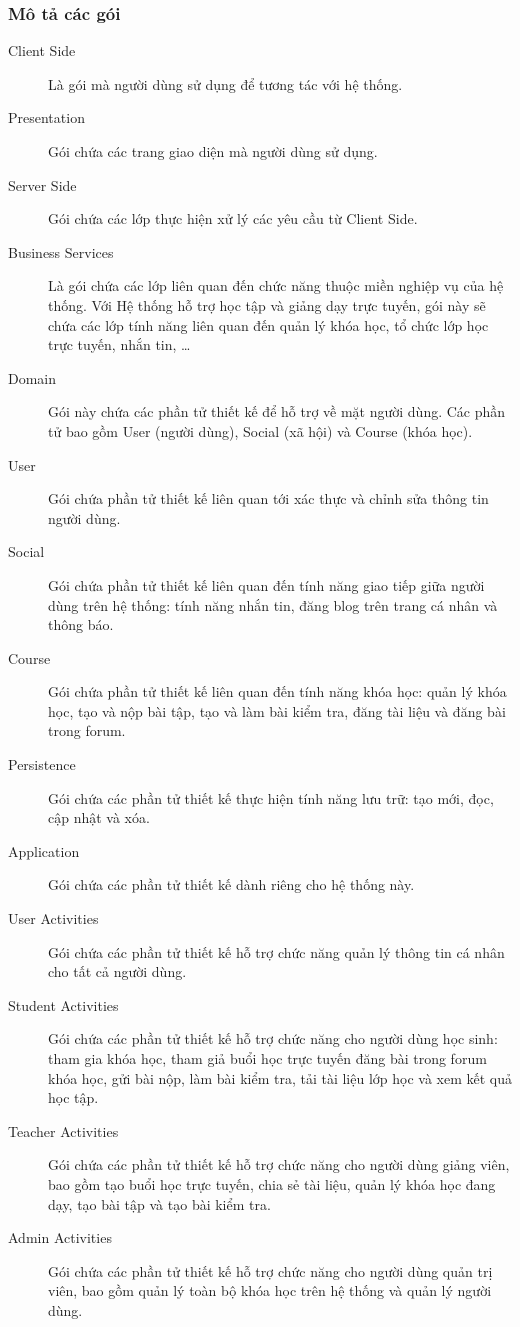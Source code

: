 \documentclass[./../main.tex]{subfiles}
\begin{document}
	\subsubsection{Mô tả các gói}
	\begin{description}
		\item[Client Side] Là gói mà người dùng sử dụng để tương tác với hệ thống.
		\item[Presentation] Gói chứa các trang giao diện mà người dùng sử dụng.
		\item[Server Side] Gói chứa các lớp thực hiện xử lý các yêu cầu từ Client Side.
		\item[Business Services] Là gói chứa các lớp liên quan đến chức năng thuộc miền nghiệp vụ của hệ thống. Với Hệ thống hỗ trợ học tập và giảng dạy trực tuyến, gói này sẽ chứa các lớp tính năng liên quan đến quản lý khóa học, tổ chức lớp học trực tuyến, nhắn tin, …
		\item[Domain] Gói này chứa các phần tử thiết kế để hỗ trợ về mặt người dùng. Các phần tử bao gồm User (người dùng), Social (xã hội) và Course (khóa học).
		\item[User] Gói chứa phần tử thiết kế liên quan tới xác thực và chỉnh sửa thông tin người dùng.
		\item[Social] Gói chứa phần tử thiết kế liên quan đến tính năng giao tiếp giữa người dùng trên hệ thống: tính năng nhắn tin, đăng blog trên trang cá nhân và thông báo.
		\item[Course] Gói chứa phần tử thiết kế liên quan đến tính năng khóa học: quản lý khóa học, tạo và nộp bài tập, tạo và làm bài kiểm tra, đăng tài liệu và đăng bài trong forum.
		\item[Persistence] Gói chứa các phần tử thiết kế thực hiện tính năng lưu trữ: tạo mới, đọc, cập nhật và xóa.
		\item[Application] Gói chứa các phần tử thiết kế dành riêng cho hệ thống này.
		\item[User Activities] Gói chứa các phần tử thiết kế hỗ trợ chức năng quản lý thông tin cá nhân cho tất cả người dùng.
		\item[Student Activities] Gói chứa các phần tử thiết kế hỗ trợ chức năng cho người dùng học sinh: tham gia khóa học, tham giả buổi học trực tuyến đăng bài trong forum khóa học, gửi bài nộp, làm bài kiểm tra, tải tài liệu lớp học và xem kết quả học tập.
		\item[Teacher Activities] Gói chứa các phần tử thiết kế hỗ trợ chức năng cho người dùng giảng viên, bao gồm tạo buổi học trực tuyến, chia sẻ tài liệu, quản lý khóa học đang dạy, tạo bài tập và tạo bài kiểm tra.
		\item[Admin Activities] Gói chứa các phần tử thiết kế hỗ trợ chức năng cho người dùng quản trị viên, bao gồm quản lý toàn bộ khóa học trên hệ thống và quản lý người dùng.
	\end{description}
\end{document}
